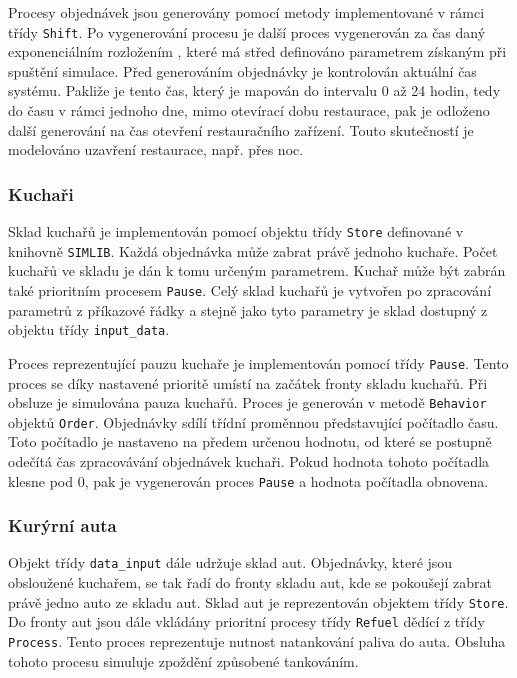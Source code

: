 \documentclass[a4paper, 11pt]{article}
\begin{document}
Procesy objednávek jsou generovány pomocí metody implementované v rámci třídy \texttt{Shift}. Po vygenerování procesu je další proces vygenerován za čas daný exponenciálním rozložením \cite[snímek 91]{IMS_course}, které má střed definováno parametrem získaným při spuštění simulace. Před generováním objednávky je kontrolován aktuální čas systému. Pakliže je tento čas, který je mapován do intervalu 0 až 24 hodin, tedy do času v rámci jednoho dne, mimo otevírací dobu restaurace, pak je odloženo další generování na čas otevření restauračního zařízení. Touto skutečností je modelováno uzavření restaurace, např. přes noc. 

\subsubsection{Kuchaři}
Sklad kuchařů je implementován pomocí objektu třídy \texttt{Store} \cite[snímek 184]{IMS_course} definované v knihovně \texttt{SIMLIB}. Každá objednávka může zabrat právě jednoho kuchaře. Počet kuchařů ve skladu je dán k tomu určeným parametrem. Kuchař může být zabrán také prioritním procesem \texttt{Pause}. Celý sklad kuchařů je vytvořen po zpracování parametrů z příkazové řádky a stejně jako tyto parametry je sklad dostupný z objektu třídy \texttt{input\_data}.

Proces reprezentující pauzu kuchaře je implementován pomocí třídy \texttt{Pause}. Tento proces se díky nastavené prioritě umístí na začátek fronty skladu kuchařů. Při obsluze je simulována pauza kuchařů. Proces je generován v metodě \texttt{Behavior} objektů \texttt{Order}. Objednávky sdílí třídní proměnnou představující počítadlo času. Toto počítadlo je nastaveno na předem určenou hodnotu, od které se postupně odečítá čas zpracovávání objednávek kuchaři. Pokud hodnota tohoto počítadla klesne pod 0, pak je vygenerován proces \texttt{Pause} a hodnota počítadla obnovena.

\subsubsection{Kurýrní auta}
Objekt třídy \texttt{data\_input} dále udržuje sklad aut. Objednávky, které jsou obsloužené kuchařem, se tak řadí do fronty skladu aut, kde se pokoušejí zabrat právě jedno auto ze skladu aut. Sklad aut je reprezentován objektem třídy \texttt{Store}. Do fronty aut jsou dále vkládány prioritní procesy třídy \texttt{Refuel} dědící z třídy \texttt{Process}. Tento proces reprezentuje nutnost natankování paliva do auta. Obsluha tohoto procesu simuluje zpoždění způsobené tankováním.
\end{document}
